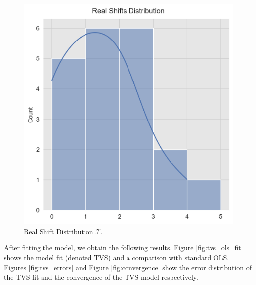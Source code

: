 \documentclass[11pt]{amsart}
\theoremstyle{definition}
\begin{document}
\begin{center}
\begin{figure}
\includegraphics[scale=0.5]{images/real_shifts.png}
\caption{Real Shift Distribution $\mathcal{T}$.}
\label{fig:real_shifts}
\end{figure}
\end{center}

After fitting the model, we obtain the following results. Figure \ref{fig:tvs_ols_fit} shows the model fit (denoted TVS) and a comparison with standard OLS. Figures \ref{fig:tvs_errors} and Figure \ref{fig:convergence} show the error distribution of the TVS fit and the convergence of the TVS model respectively.
\end{document}

